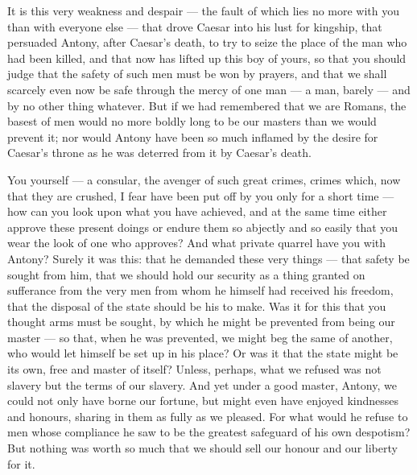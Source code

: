  It is this very weakness and despair --- the fault of which lies no more with you than with everyone else --- that drove Caesar into his lust for kingship, that persuaded Antony, after Caesar's death, to try to seize the place of the man who had been killed, and that now has lifted up this boy of yours, so that you should judge that the safety of such men must be won by prayers, and that we shall scarcely even now be safe through the mercy of one man --- a man, barely --- and by no other thing whatever. But if we had remembered that we are Romans, the basest of men would no more boldly long to be our masters than we would prevent it; nor would Antony have been so much inflamed by the desire for Caesar's throne as he was deterred from it by Caesar's death.

 You yourself --- a consular, the avenger of such great crimes, crimes which, now that they are crushed, I fear have been put off by you only for a short time --- how can you look upon what you have achieved, and at the same time either approve these present doings or endure them so abjectly and so easily that you wear the look of one who approves? And what private quarrel have you with Antony? Surely it was this: that he demanded these very things --- that safety be sought from him, that we should hold our security as a thing granted on sufferance from the very men from whom he himself had received his freedom, that the disposal of the state should be his to make. Was it for this that you thought arms must be sought, by which he might be prevented from being our master --- so that, when he was prevented, we might beg the same of another, who would let himself be set up in his place? Or was it that the state might be its own, free and master of itself? Unless, perhaps, what we refused was not slavery but the terms of our slavery. And yet under a good master, Antony, we could not only have borne our fortune, but might even have enjoyed kindnesses and honours, sharing in them as fully as we pleased. For what would he refuse to men whose compliance he saw to be the greatest safeguard of his own despotism? But nothing was worth so much that we should sell our honour and our liberty for it.

